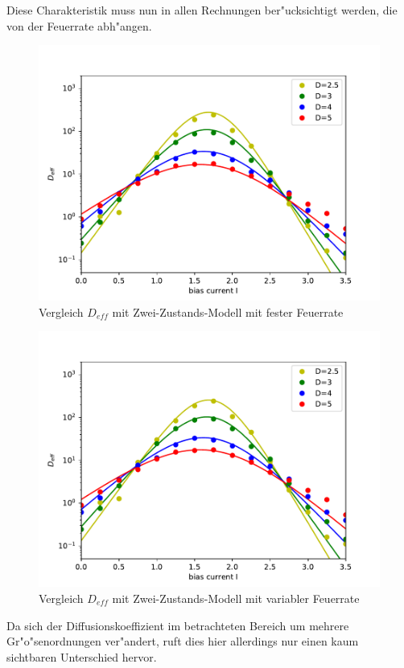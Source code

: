 \documentclass[12pt,a4paper]{article}
\begin{document}
Diese Charakteristik muss nun in allen Rechnungen ber"ucksichtigt werden, die von der Feuerrate abh"angen.
\begin{figure}[H]
	\centering
	\includegraphics[scale=0.9]{./Bachelorarbeit/bachelorarbeit/dcompdf29m.pdf}
	\caption{Vergleich $D_{eff}$ mit Zwei-Zustands-Modell mit fester Feuerrate}
	\label{dcomp}
\end{figure}
\begin{figure}[H]
	\centering
	\includegraphics[scale=0.9]{./Bachelorarbeit/bachelorarbeit/dcompdf29mvarv.pdf}
	\caption{Vergleich $D_{eff}$ mit Zwei-Zustands-Modell mit variabler Feuerrate}
	\label{dcompvarv}
\end{figure}
Da sich der Diffusionskoeffizient im betrachteten Bereich um mehrere Gr"o"senordnungen ver"andert, ruft dies hier allerdings nur einen kaum sichtbaren Unterschied hervor.
\end{document}
